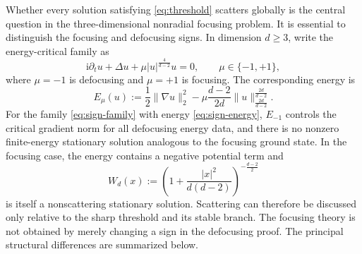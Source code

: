 \documentclass{interact}
\numberwithin{equation}{section}
\theoremstyle{plain}
\theoremstyle{definition}
\theoremstyle{remark}
\newcommand{\ii}{\mathrm i}
\begin{document}
Whether every solution satisfying \eqref{eq:threshold} scatters globally is the central question in the three-dimensional nonradial focusing problem. It is essential to distinguish the focusing and defocusing signs. In dimension $d\ge3$, write the energy-critical family as
\begin{equation}\label{eq:sign-family}
 \ii\partial_tu+\Delta u+\mu |u|^{\frac4{d-2}}u=0,
 \qquad \mu\in\{-1,+1\},
\end{equation}
where $\mu=-1$ is defocusing and $\mu=+1$ is focusing. The corresponding energy is
\begin{equation}\label{eq:sign-energy}
 E_\mu(u)
 :=\frac12\|\nabla u\|_2^2
   -\mu\frac{d-2}{2d}
    \|u\|_{\frac{2d}{d-2}}^{\frac{2d}{d-2}}.
\end{equation}
For the family \eqref{eq:sign-family} with energy \eqref{eq:sign-energy}, $E_{-1}$ controls the critical gradient norm for all defocusing energy data, and there is no nonzero finite-energy stationary solution analogous to the focusing ground state. In the focusing case, the energy contains a negative potential term and
\[
 W_d(x):=\left(1+\frac{|x|^2}{d(d-2)}\right)^{-\frac{d-2}{2}}
\]
is itself a nonscattering stationary solution. Scattering can therefore be discussed only relative to the sharp threshold and its stable branch. The focusing theory is not obtained by merely changing a sign in the defocusing proof. The principal structural differences are summarized below.
\end{document}
